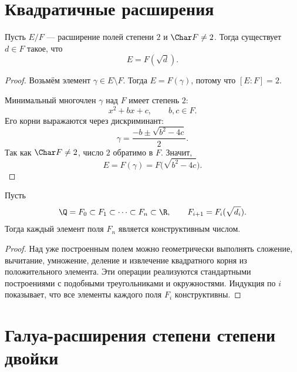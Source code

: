 \section{Квадратичные расширения}

\begin{stmt}
    Пусть $E/F$ --- расширение полей степени $2$ и $\Char F\neq2$. Тогда существует $d\in F$ такое, что
    \[
        E=F(\sqrt d).
    \]

    \begin{proof}
        Возьмём элемент $\gamma\in E\setminus F$. Тогда $E=F(\gamma)$, потому что $[E:F]=2$.

        Минимальный многочлен $\gamma$ над $F$ имеет степень $2$:
        \[
            x^2+bx+c, \qquad b,c\in F.
        \]
        Его корни выражаются через дискриминант:
        \[
            \gamma=\frac{-b\pm\sqrt{b^2-4c}}{2}.
        \]
        Так как $\Char F\neq2$, число $2$ обратимо в $F$. Значит,
        \[
            E=F(\gamma)=F\bigl(\sqrt{b^2-4c}\bigr).
        \]
    \end{proof}
\end{stmt}

\begin{stmt}
    Пусть
    \[
        \Q = F_0 \subset F_1 \subset \cdots \subset F_n \subset \R,
        \qquad F_{i+1}=F_i(\sqrt{d_i}).
    \]
    Тогда каждый элемент поля $F_n$ является конструктивным числом.

    \begin{proof}
        Над уже построенным полем можно геометрически выполнять сложение, вычитание, умножение, деление и извлечение квадратного корня из положительного элемента.
        Эти операции реализуются стандартными построениями с подобными треугольниками и окружностями.
        Индукция по $i$ показывает, что все элементы каждого поля $F_i$ конструктивны.
    \end{proof}
\end{stmt}

\section{Галуа-расширения степени степени двойки}

